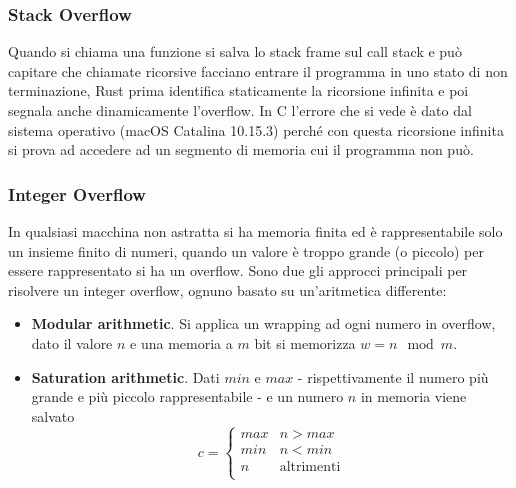 \documentclass{article}
\begin{document}
\subsubsection{Stack Overflow}
Quando si chiama una funzione si salva lo stack frame sul call stack e può capitare che chiamate ricorsive facciano entrare il programma in uno stato di non terminazione, Rust prima identifica staticamente la ricorsione infinita e poi segnala anche dinamicamente l'overflow. In C l'errore che si vede è dato dal sistema operativo (macOS Catalina 10.15.3) perché con questa ricorsione infinita si prova ad accedere ad un segmento  di memoria cui il programma non può.







\subsubsection{Integer Overflow}
In qualsiasi macchina non astratta si ha memoria finita ed è rappresentabile solo un insieme finito di numeri, quando un valore è troppo grande (o piccolo) per essere rappresentato si ha un overflow. Sono due gli approcci principali per risolvere un integer overflow, ognuno basato su un'aritmetica differente:
\begin{itemize}
    \item \textbf{Modular arithmetic}. Si applica un wrapping ad ogni numero in overflow, dato il valore $n$ e una memoria a $m$ bit si memorizza $w = n \mod m$.
    \item \textbf{Saturation arithmetic}. Dati $min$ e $max$ - rispettivamente il numero più grande e più piccolo rappresentabile - e un numero $n$ in memoria viene salvato
    \begin{equation*}
        c = \begin{cases}
            max & n > max \\
            min & n < min \\
            n  & \text{altrimenti} \\
        \end{cases}
    \end{equation*}
\end{itemize}
\end{document}
